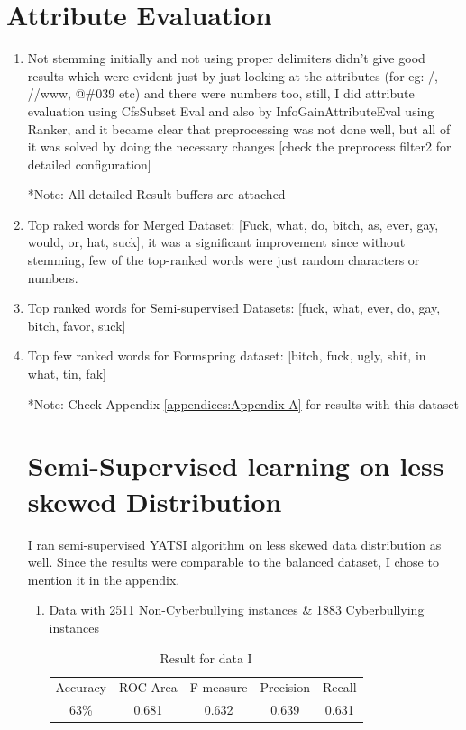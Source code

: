 \documentclass[10pt,conference]{IEEEtran}
\begin{document}
\section{Attribute Evaluation}
\label{appendices: Appendix B}
\begin{enumerate}
    \item Not stemming initially and not using proper delimiters didn’t give good results which were evident just by just looking at the attributes (for eg: /, //www, @\#039 etc) and there were numbers too, still, I did attribute evaluation using CfsSubset Eval and also by InfoGainAttributeEval using Ranker, and it became clear that preprocessing was not done well, but all of it was solved by doing the necessary changes [check the preprocess filter2 for detailed configuration]

*Note: All detailed Result buffers are attached
\item Top raked words for Merged Dataset: [Fuck, what, do, bitch, as, ever, gay, would, or, hat, suck], it was a significant improvement since without stemming, few of the top-ranked words were just random characters or numbers.
\item Top ranked words for Semi-supervised Datasets: [fuck, what, ever, do, gay, bitch, favor, suck]
\item Top few ranked words for Formspring dataset: [bitch, fuck, ugly, shit, in what, tin, fak] 

*Note: Check Appendix \ref{appendices:Appendix A} for results with this dataset

\section{Semi-Supervised learning on less skewed Distribution}
\label{appendices: Appendix C}
I ran semi-supervised YATSI algorithm on less skewed data distribution as well. Since the results were comparable to the balanced dataset, I chose to mention it in the appendix.
\begin{enumerate}
    \item Data with 2511 Non-Cyberbullying instances \& 1883 Cyberbullying instances
    \begin{table}[htbp]
    \caption{Result for data I}
        \centering
        \begin{tabular}{c|c|c|c|c}
            Accuracy & ROC Area & F-measure & Precision & Recall \\
            63\% & 0.681 & 0.632 & 0.639 & 0.631 \\
        \end{tabular}
        \label{tab:my_label}
    \end{table}
    

\end{enumerate}
\end{enumerate}
\end{document}
